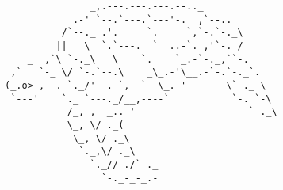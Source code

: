 \documentclass{article}
\begin{document}
\vfill
\centering
\small
\begin{BVerbatim}
               _,.---.---.---.--.._ 
           _.-' `--.`---.`---'-. _,`--.._
          /`--._ .'.     `.     `,`-.`-._\
         ||   \  `.`---.__`__..-`. ,'`-._/
    _  ,`\ `-._\   \    `.    `_.-`-._,``-.
 ,`   `-_ \/ `-.`--.\    _\_.-'\__.-`-.`-._`.
(_.o> ,--. `._/'--.-`,--`  \_.-'       \`-._ \
 `---'    `._ `---._/__,----`           `-. `-\
           /_, ,  _..-'                    `-._\
           \_, \/ ._(
            \_, \/ ._\
             `._,\/ ._\
               `._// ./`-._
                 `-._-_-_.-
\end{BVerbatim}
\end{document}
